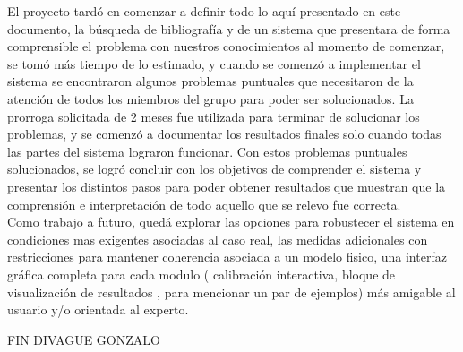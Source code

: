 El proyecto tardó en comenzar a definir todo lo aquí presentado en este documento, la búsqueda de bibliografía y de un sistema que presentara de forma comprensible el problema con nuestros conocimientos al momento de comenzar, se tomó más tiempo de lo estimado, y cuando se comenzó a implementar el sistema se encontraron algunos problemas puntuales que necesitaron de la atención de todos los miembros del grupo para poder ser solucionados. La prorroga solicitada de 2 meses fue utilizada para terminar de solucionar los problemas, y se comenzó a documentar los resultados finales solo cuando todas las partes del sistema lograron funcionar. Con estos problemas puntuales solucionados, se logró concluir con los objetivos de comprender el sistema y presentar los distintos pasos para poder obtener resultados que muestran que la comprensión e interpretación de todo aquello que se relevo fue correcta.
\\ 

Como trabajo a futuro, quedá explorar las opciones para robustecer el sistema en condiciones mas exigentes asociadas al caso real, las medidas adicionales con restricciones para mantener coherencia asociada a un modelo fisico, una interfaz gráfica completa para cada modulo ( calibración interactiva, bloque de visualización de resultados , para mencionar un par de ejemplos) más amigable al usuario y/o orientada al experto.

FIN DIVAGUE GONZALO


